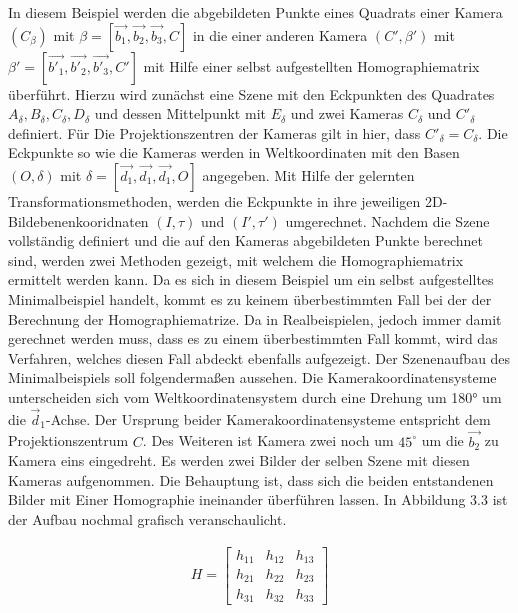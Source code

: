 In diesem Beispiel werden die abgebildeten Punkte eines Quadrats einer Kamera $(C_\beta)$ mit $\beta= [\vec{b_1},\vec{b_2},\vec{b_3},C]$ in die einer anderen Kamera $(C',\beta')$ mit $\beta'= [\vec{b'_1},\vec{b'_2},\vec{b'_3},C']$  mit Hilfe einer selbst aufgestellten Homographiematrix überführt. Hierzu wird zunächst eine Szene mit den Eckpunkten des Quadrates $A_\delta, B_\delta, C_\delta, D_\delta$ und dessen Mittelpunkt mit $E_\delta$ und zwei Kameras $C_{\delta}$ und $C'_{\delta}$ definiert. Für Die Projektionszentren der Kameras gilt in hier, dass $C'_{\delta} = C_\delta$. Die Eckpunkte so wie die Kameras werden in Weltkoordinaten mit den Basen $(O,\delta)$ mit $\delta = [\vec{d_1},\vec{d_1},\vec{d_1},O]$ angegeben. Mit Hilfe der gelernten Transformationsmethoden, werden die Eckpunkte in ihre jeweiligen 2D-Bildebenenkooridnaten $(I,\tau)$ und $(I',\tau')$ umgerechnet. Nachdem die Szene vollständig definiert und die auf den Kameras abgebildeten Punkte berechnet sind, werden zwei Methoden gezeigt, mit welchem die Homographiematrix ermittelt werden kann. Da es sich in diesem Beispiel um ein selbst aufgestelltes Minimalbeispiel handelt, kommt es zu keinem überbestimmten Fall bei der der Berechnung der Homographiematrize. Da in Realbeispielen, jedoch immer damit gerechnet werden muss, dass es zu einem überbestimmten Fall kommt, wird das Verfahren, welches diesen Fall abdeckt ebenfalls aufgezeigt. Der Szenenaufbau des Minimalbeispiels soll folgendermaßen aussehen. Die Kamerakoordinatensysteme unterscheiden sich vom Weltkoordinatensystem durch eine Drehung um 180° um die \ensuremath{\vec{d}_1}-Achse. Der Ursprung beider Kamerakoordinatensysteme entspricht dem Projektionszentrum $C$. Des Weiteren ist Kamera zwei noch um $45^\circ$ um die $\vec{b_2}$ zu Kamera eins eingedreht. Es werden zwei Bilder der selben Szene mit diesen Kameras aufgenommen. Die Behauptung ist, dass sich die beiden entstandenen Bilder mit Einer Homographie ineinander überführen lassen. In Abbildung 3.3 ist der Aufbau nochmal grafisch veranschaulicht.

\begin{gather}
H=
\begin{bmatrix}
h_{11}&h_{12}&h_{13}\\
h_{21}&h_{22}&h_{23}\\
h_{31}&h_{32}&h_{33}
\end{bmatrix}
\end{gather}\\


